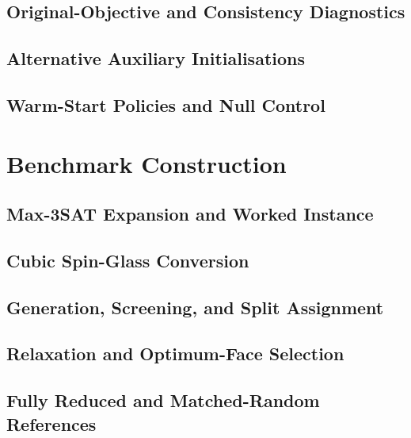 \documentclass[journal,onecolumn,11pt]{IEEEtran}
\theoremstyle{plain}
\begin{document}
\subsection{Original-Objective and Consistency Diagnostics}
\label{sup:warmstart:diagnostics}

\subsection{Alternative Auxiliary Initialisations}
\label{sup:warmstart:alternatives}

\subsection{Warm-Start Policies and Null Control}
\label{sup:warmstart:policies}

\section{Benchmark Construction}
\label{sup:benchmarks}

\subsection{Max-3SAT Expansion and Worked Instance}
\label{sup:benchmarks:max3sat}

\subsection{Cubic Spin-Glass Conversion}
\label{sup:benchmarks:spinglass}

\subsection{Generation, Screening, and Split Assignment}
\label{sup:benchmarks:generation}

\subsection{Relaxation and Optimum-Face Selection}
\label{sup:benchmarks:relaxation}

\subsection{Fully Reduced and Matched-Random References}
\label{sup:benchmarks:references}
\end{document}
